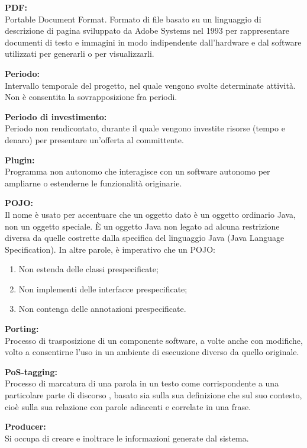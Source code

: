 \documentclass[a4paper, oneside, openany, dvipsnames, table]{article}
\begin{document}
\textbf{PDF:}\\	Portable Document Format. Formato di file basato su un linguaggio di descrizione di pagina sviluppato da Adobe Systems nel 1993 per rappresentare documenti di testo e immagini in modo indipendente dall'hardware e dal software utilizzati per generarli o per visualizzarli.

\textbf{Periodo:}\\	Intervallo temporale del progetto, nel quale vengono svolte determinate attività. Non è consentita la sovrapposizione fra periodi.

\textbf{Periodo di investimento:}\\	Periodo non rendicontato, durante il quale vengono investite risorse (tempo e denaro) per presentare un'offerta al committente.

\textbf{Plugin:}\\	Programma non autonomo che interagisce con un software autonomo per ampliarne o estenderne le funzionalità originarie.

\label{crts:POJO}
\textbf{POJO:}\\	Il nome è usato per accentuare che un oggetto dato è un oggetto ordinario Java, non un oggetto speciale. \`E un oggetto Java non legato ad alcuna restrizione diversa da quelle costrette dalla specifica del linguaggio Java (Java Language Specification). In altre parole, è imperativo che un POJO:
\begin{enumerate}
\item Non estenda delle classi prespecificate;
\item Non implementi delle interfacce prespecificate;
\item Non contenga delle annotazioni prespecificate.
\end{enumerate}

\textbf{Porting:}\\	Processo di trasposizione di un componente software, a volte anche con modifiche, volto a consentirne l'uso in un ambiente di esecuzione diverso da quello originale.

\textbf{PoS-tagging:}\\	 Processo di marcatura di una parola in un testo come corrispondente a una particolare parte di discorso , basato sia sulla sua definizione che sul suo contesto, cioè sulla sua relazione con parole adiacenti e correlate in una frase.

\textbf{Producer:}\\	Si occupa di creare e inoltrare le informazioni generate dal sistema.
\end{document}
